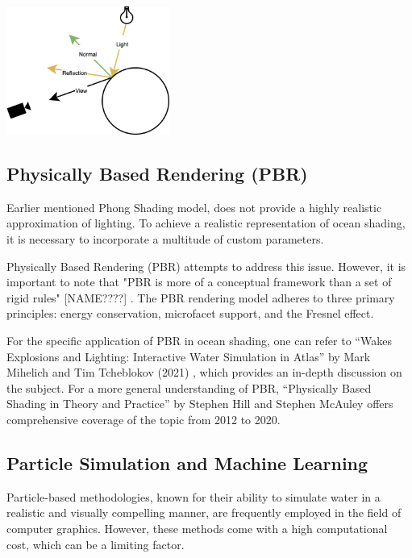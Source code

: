\begin{minipage}{1\textwidth}
    \centering
    \includegraphics[width=0.4\textwidth]{"images/phong_graph.png"}
    \label{fig:phong_graph}
\end{minipage}

\subsection{Physically Based Rendering (PBR)}
Earlier mentioned Phong Shading model, does not provide a highly realistic approximation of lighting. To achieve a realistic representation of ocean shading, it is necessary to incorporate a multitude of custom parameters.

Physically Based Rendering (PBR) attempts to address this issue. However, it is important to note that "PBR is more of a conceptual framework than a set of rigid rules" [NAME????] \cite{wilson2017}. The PBR rendering model adheres to three primary principles: energy conservation, microfacet support, and the Fresnel effect.

For the specific application of PBR in ocean shading, one can refer to “Wakes Explosions and Lighting: Interactive Water Simulation in Atlas” by Mark Mihelich and Tim Tcheblokov (2021) \cite{mark2021}, which provides an in-depth discussion on the subject. For a more general understanding of PBR, “Physically Based Shading in Theory and Practice” by Stephen Hill and Stephen McAuley \cite{stephan2012} offers comprehensive coverage of the topic from 2012 to 2020.

\subsection{Particle Simulation and Machine Learning}
Particle-based methodologies, known for their ability to simulate water in a realistic and visually compelling manner, are frequently employed in the field of computer graphics. However, these methods come with a high computational cost, which can be a limiting factor.

